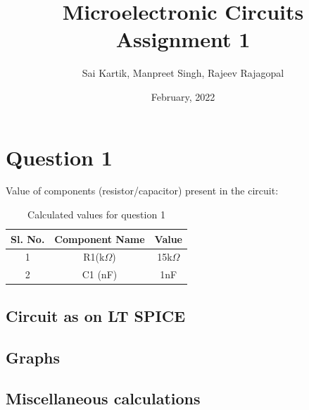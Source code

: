 \documentclass{article}[12pt]
\title{Microelectronic Circuits Assignment 1}
\author{Sai Kartik, Manpreet Singh, Rajeev Rajagopal}
\date{February, 2022}
\begin{document}
\maketitle
\section*{Question 1}
Value of components (resistor/capacitor) present in the circuit:
\begin{table}[ht]
    \centering
    \caption{Calculated values for question 1}
    \begin{tabular}{|c | c | c|}
        \hline
        Sl. No. & Component Name & Value       \\
        \hline
        1       & R1(k$\Omega$)  & 15k$\Omega$ \\ %
        2       & C1 (nF)        & 1nF         \\ %
        \hline
    \end{tabular}
    \label{tab:values1}
\end{table}
\subsection*{Circuit as on LT SPICE}
\subsection*{Graphs}
\subsection*{Miscellaneous calculations}
\newpage
\end{document}
